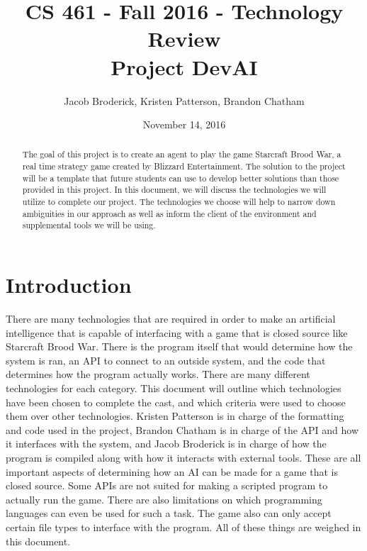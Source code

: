 \begin{titlepage}

  \title{CS 461 - Fall 2016 - Technology Review \\ Project DevAI}
  \author{Jacob Broderick, Kristen Patterson, Brandon Chatham}
  \date{November 14, 2016}
  \maketitle
  \vspace{4cm}
  \begin{abstract}
  	\noindent 
  	  	\noindent
	The goal of this project is to create an agent to play the game Starcraft Brood War, a real time strategy game created by Blizzard Entertainment. The solution to the project will be a template that future students can use to develop better solutions than those provided in this project. In this document, we will discuss the technologies we will utilize to complete our project. The technologies we choose will help to narrow down ambiguities in our approach as well as inform the client of the environment and supplemental tools we will be using.
   \end{abstract}
\end{titlepage}


\section{Introduction}
There are many technologies that are required in order to make an artificial intelligence that is capable of interfacing with a game that is closed source like Starcraft Brood War. There is the program itself that would determine how the system is ran, an API to connect to an outside system, and the code that determines how the program actually works. There are many different technologies for each category. This document will outline which technologies have been chosen to complete the cast, and which criteria were used to choose them over other technologies. Kristen Patterson is in charge of the formatting and code used in the project, Brandon Chatham is in charge of the API and how it interfaces with the system, and Jacob Broderick is in charge of how the program is compiled along with how it interacts with external tools. These are all important aspects of determining how an AI can be made for a game that is closed source. Some APIs are not suited for making a scripted program to actually run the game. There are also limitations on which programming languages can even be used for such a task. The game also can only accept certain file types to interface with the program. All of these things are weighed in this document.

